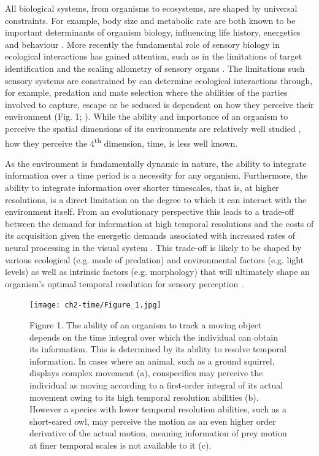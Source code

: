 All biological systems, from organisms to ecosystems, are shaped by universal constraints. For example, body size and metabolic rate are both known to be important determinants of organism biology, influencing life history, energetics and behaviour \citep{brown2004, woodward2005, sibly2012metabolic}. More recently the fundamental role of sensory biology in ecological interactions has gained attention, such as in the limitations of target identification \citep{tosh2010modelling} and the scaling allometry of sensory organs \citep{howland2004allometry,cronin2005role,garamszegi2002coevolving}. The limitations such sensory systems are constrained by can determine ecological interactions through, for example, predation and mate selection where the abilities of the parties involved to capture, escape or be seduced is dependent on how they perceive their environment (Fig. 1; \citealt{cronin2005role,clark2012field,hornstein2000sexual,stevens2007predator}). While the ability and importance of an organism to perceive the spatial dimensions of its environments are relatively well studied \citep{cronin2005role,clark2012field}, how they perceive the 4\textsuperscript{th} dimension, time, is less well known.

As the environment is fundamentally dynamic in nature, the ability to integrate information over a time period is a necessity for any organism. Furthermore, the ability to integrate information over shorter timescales, that is, at higher resolutions, is a direct limitation on the degree to which it can interact with the environment itself. From an evolutionary perspective this leads to a trade-off between the demand for information at high temporal resolutions and the costs of its acquisition given the energetic demands associated with increased rates of neural processing in the visual system \citep{laughlin2001energy}. This trade-off is likely to be shaped by various ecological (e.g. mode of predation) and environmental factors (e.g. light levels) as well as intrinsic factors (e.g. morphology) that will ultimately shape an organism's optimal temporal resolution for sensory perception \citep{autrum1958electrophysiological}.


\begin{figure}[p]
  \centering
  \texttt{[image: ch2-time/Figure\_1.jpg]}
  \caption*{Figure 1. The ability of an organism to track a moving object depends on the time integral over which the individual can obtain its information. This is determined by its ability to resolve temporal information. In cases where an animal, such as a ground squirrel, displays complex movement (a), conspecifics may perceive the individual as moving according to a first-order integral of its actual movement owing to its high temporal resolution abilities (b). However a species with lower temporal resolution abilities, such as a short-eared owl, may perceive the motion as an even higher order derivative of the actual motion, meaning information of prey motion at finer temporal scales is not available to it (c).}
  \label{fig:Figure 1.}
\end{figure}


